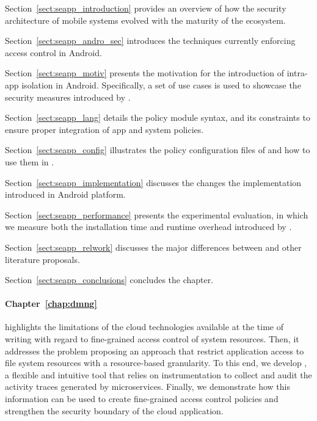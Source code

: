 \begin{compactitem}
    \item Section~\ref{sect:seapp_introduction} provides an overview
     of how the security architecture of mobile systems evolved with
     the maturity of the ecosystem.
    \item Section~\ref{sect:seapp_andro_sec} introduces the techniques
     currently enforcing access control in Android.
    \item Section~\ref{sect:seapp_motiv} presents the motivation for
     the introduction of intra-app isolation in Android. Specifically,
     a set of use cases is used to showcase the security measures
     introduced by \seapp.
    \item Section~\ref{sect:seapp_lang} details the \seapp policy
     module syntax, and its constraints to ensure proper integration
     of app and system policies.
    \item Section~\ref{sect:seapp_config} illustrates the policy
     configuration files of \sea and how to use them in \seapp.
    \item Section~\ref{sect:seapp_implementation} discusses the
     changes the \seapp implementation introduced in Android platform.
    \item Section~\ref{sect:seapp_performance} presents the
     experimental evaluation, in which we measure both the
     installation time and runtime overhead introduced by \seapp.
    \item Section~\ref{sect:seapp_relwork} discusses the major
     differences between \seapp and other literature proposals.
    \item Section~\ref{sect:seapp_conclusions} concludes the chapter.
\end{compactitem}
\medskip

\paragraph*{Chapter~\ref{chap:dmng}} highlights the limitations of
the cloud technologies available at the time of writing with regard to
fine-grained access control of system resources. Then, it addresses
the problem proposing an approach that restrict application access to
file system resources with a resource-based granularity. To this end,
we develop \dmng, a flexible and intuitive tool that relies on
instrumentation to collect and audit the activity traces generated by
microservices. Finally, we demonstrate how this information can be
used to create fine-grained access control policies and strengthen the
security boundary of the cloud application.

